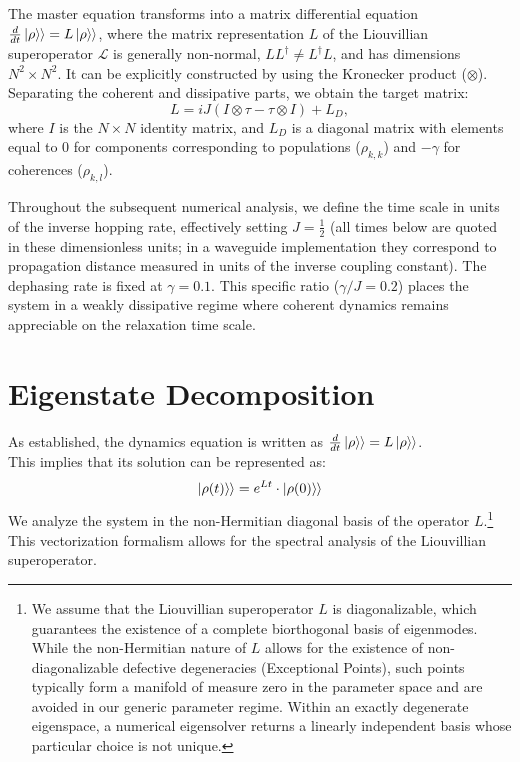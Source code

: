 \documentclass[pdflatex,sn-mathphys-num]{sn-jnl}
\newcommand{\ketket}[1]{\left| #1 \right\rangle \! \mathclose{\left. \vphantom{#1} \right\rangle}}
\begin{document}
The master equation transforms into a matrix differential equation $\frac{d}{dt}\ketket{\rho} = L\ketket{\rho}$, where the matrix representation $L$ of the Liouvillian superoperator $\mathcal{L}$ is generally non-normal, $LL^{\dagger}\ne L^{\dagger}L$, and has dimensions $N^2 \times N^2$. It can be explicitly constructed by using the Kronecker product ($\otimes$). Separating the coherent and dissipative parts, we obtain the target matrix:
\begin{equation}
L = iJ(I \otimes \tau - \tau \otimes I) + L_D,
\label{eq:L}
\end{equation}
where $I$ is the $N \times N$ identity matrix, and $L_D$ is a diagonal matrix with elements equal to $0$ for components corresponding to populations ($\rho_{k,k}$) and $-\gamma$ for coherences ($\rho_{k,l}$).\

Throughout the subsequent numerical analysis, we define the time scale in units of the inverse hopping rate, effectively setting \textbf{$J=\frac{1}{2}$} (all times below are quoted in these dimensionless units; in a waveguide implementation they correspond to propagation distance measured in units of the inverse coupling constant). The dephasing rate is fixed at \textbf{$\gamma=0.1$}. This specific ratio ($\gamma/J = 0.2$) places the system in a weakly dissipative regime where coherent dynamics remains appreciable on the relaxation time scale.


\section{Eigenstate Decomposition}
As established, the dynamics equation is written as $\frac{d}{dt}\ketket{\rho} = L \ketket{\rho}$.\\
This implies that its solution can be represented as:
\begin{equation}
\ketket{\rho(t)}=e^{Lt}\cdot \ketket{\rho(0)}
\label{eq:solv_format}
\end{equation}
We analyze the system in the {non-Hermitian} diagonal basis of the operator $L$.\footnote{We assume that the Liouvillian superoperator $L$ is diagonalizable, which guarantees the existence of a complete biorthogonal basis of eigenmodes. While the non-Hermitian nature of $L$ allows for the existence of non-diagonalizable defective degeneracies (Exceptional Points), such points typically form a manifold of measure zero in the parameter space and are avoided in our generic parameter regime. Within an exactly degenerate eigenspace, a numerical eigensolver returns a linearly independent basis whose particular choice is not unique.} This vectorization formalism allows for the spectral analysis of the Liouvillian superoperator.\cite{minganti2018}
\end{document}
